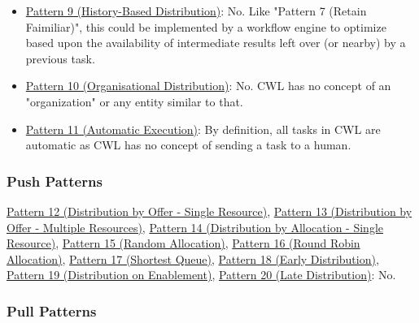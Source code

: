 \begin{itemize}
\item \href{http://www.workflowpatterns.com/patterns/resource/creation/wrp9.php}{Pattern 9 (History-Based Distribution)}: No. Like "Pattern 7 (Retain Faimiliar)", this could be implemented by a workflow engine to optimize based upon the availability of intermediate results left over (or nearby) by a previous task.

\item \href{http://www.workflowpatterns.com/patterns/resource/creation/wrp10.php}{Pattern 10 (Organisational Distribution)}: No. CWL has no concept of an "organization" or any entity similar to that.

\item \href{http://www.workflowpatterns.com/patterns/resource/creation/wrp11.php}{Pattern 11 (Automatic Execution)}: By definition, all tasks in CWL are automatic as CWL has no concept of sending a task to a human.
\end{itemize}
\subsubsection{Push Patterns}

\href{http://www.workflowpatterns.com/patterns/resource/push/wrp12.php}{Pattern 12 (Distribution by Offer - Single Resource)}, \href{http://www.workflowpatterns.com/patterns/resource/push/wrp13.php}{Pattern 13 (Distribution by Offer - Multiple Resources)}, \href{http://www.workflowpatterns.com/patterns/resource/push/wrp14.php}{Pattern 14 (Distribution by Allocation - Single Resource)}, \href{http://www.workflowpatterns.com/patterns/resource/push/wrp15.php}{Pattern 15 (Random Allocation)}, \href{http://www.workflowpatterns.com/patterns/resource/push/wrp16.php}{Pattern 16 (Round Robin Allocation)}, \href{http://www.workflowpatterns.com/patterns/resource/push/wrp17.php}{Pattern 17 (Shortest Queue)}, \href{http://www.workflowpatterns.com/patterns/resource/push/wrp18.php}{Pattern 18 (Early Distribution)}, \href{http://www.workflowpatterns.com/patterns/resource/push/wrp19.php}{Pattern 19 (Distribution on Enablement)}, \href{http://www.workflowpatterns.com/patterns/resource/push/wrp20.php}{Pattern 20 (Late Distribution)}: No.

\subsubsection{Pull Patterns}

